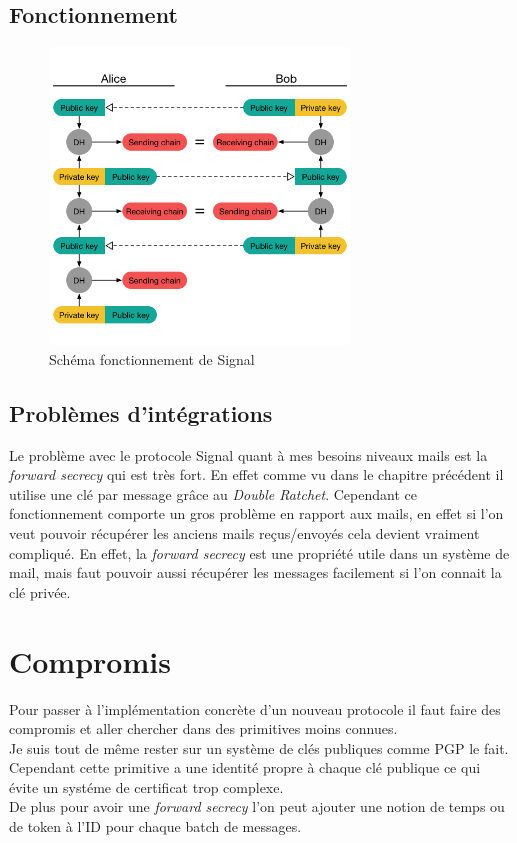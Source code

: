 \subsection{Fonctionnement}
\begin{figure}[h!]
	\centering
	\includegraphics[width=8cm]{images/signalFonctionnement.png}
	\caption{Schéma fonctionnement de Signal\cite{doubleratchet}}
	\label{fig:signal}
\end{figure}
\subsection{Problèmes d'intégrations}
Le problème avec le protocole Signal quant à mes besoins niveaux mails est la \textit{forward secrecy} qui est très fort. En effet comme vu dans le chapitre précédent il utilise une clé par message grâce au \textit{Double Ratchet}. Cependant ce fonctionnement comporte un gros problème en rapport aux mails, en effet si l'on veut pouvoir récupérer les anciens mails reçus/envoyés cela devient vraiment compliqué. En effet, la \textit{forward secrecy} est une propriété utile dans un système de mail, mais faut pouvoir aussi récupérer les messages facilement si l'on connait la clé privée.
\section{Compromis}
Pour passer à l'implémentation concrète d'un nouveau protocole il faut faire des compromis et aller chercher dans des primitives moins connues.\\
Je suis tout de même rester sur un système de clés publiques comme PGP le fait. Cependant cette primitive a une identité propre à chaque clé publique ce qui évite un systéme de certificat trop complexe.\\
De plus pour avoir une \textit{forward secrecy} l'on peut ajouter une notion de temps ou de token à l'ID pour chaque batch de messages.
